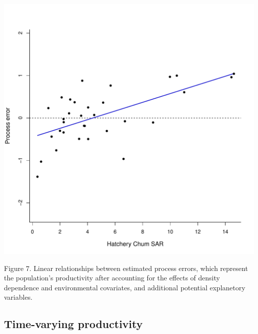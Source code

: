 \documentclass[11pt,]{article}
\begin{document}
\begin{center}\includegraphics{App_3_Summarize_results_files/figure-latex/fig_6_process_error_corr-1} \end{center}

Figure 7. Linear relationships between estimated process errors, which
represent the population's productivity after accounting for the effects
of density dependence and environmental covariates, and additional
potential explanetory variables.

\subsection{Time-varying
productivity}\label{time-varying-productivity-1}
\end{document}
